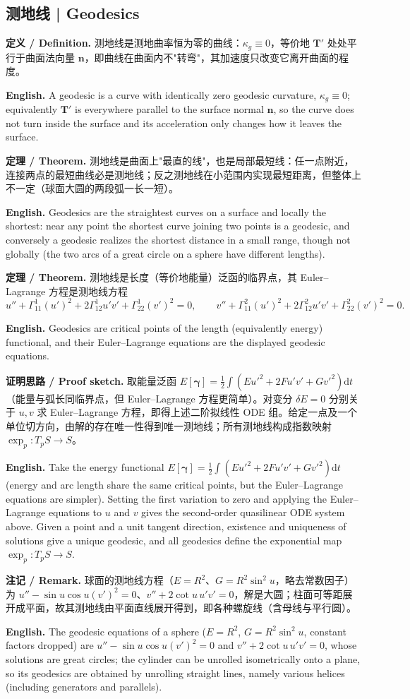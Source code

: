 \documentclass[UTF8,11pt,a4paper]{ctexart}
\newcommand{\EN}[1]{\par\noindent \textbf{English.} #1\par}
\newcommand{\DEF}[2]{\par\noindent\textbf{定义 / Definition.} #1\par\EN{#2}\par\smallskip}
\newcommand{\THM}[2]{\par\noindent\textbf{定理 / Theorem.} #1\par\EN{#2}\par\smallskip}
\newcommand{\PROOF}[2]{\par\noindent\textbf{证明思路 / Proof sketch.} #1\par\EN{#2}\par\smallskip}
\newcommand{\REM}[2]{\par\noindent\textbf{注记 / Remark.} #1\par\EN{#2}\par\smallskip}
\newcommand{\dd}{\mathrm{d}}
\newcommand{\bn}{\mathbf{n}}
\newcommand{\bT}{\mathbf{T}}
\newcommand{\bgamma}{\boldsymbol{\gamma}}
\begin{document}
\subsection{测地线 | Geodesics}
\DEF{测地线是测地曲率恒为零的曲线：$\kappa_g\equiv0$，等价地 $\bT'$ 处处平行于曲面法向量 $\bn$，即曲线在曲面内不"转弯"，其加速度只改变它离开曲面的程度。}{A geodesic is a curve with identically zero geodesic curvature, $\kappa_g\equiv0$; equivalently $\bT'$ is everywhere parallel to the surface normal $\bn$, so the curve does not turn inside the surface and its acceleration only changes how it leaves the surface.}
\THM{测地线是曲面上"最直的线"，也是局部最短线：任一点附近，连接两点的最短曲线必是测地线；反之测地线在小范围内实现最短距离，但整体上不一定（球面大圆的两段弧一长一短）。}{Geodesics are the straightest curves on a surface and locally the shortest: near any point the shortest curve joining two points is a geodesic, and conversely a geodesic realizes the shortest distance in a small range, though not globally (the two arcs of a great circle on a sphere have different lengths).}
\THM{测地线是长度（等价地能量）泛函的临界点，其 Euler--Lagrange 方程是测地线方程
\[
u''+\Gamma^1_{11}(u')^2+2\Gamma^1_{12}u'v'+\Gamma^1_{22}(v')^2=0,\qquad
v''+\Gamma^2_{11}(u')^2+2\Gamma^2_{12}u'v'+\Gamma^2_{22}(v')^2=0 .
\]
}{Geodesics are critical points of the length (equivalently energy) functional, and their Euler--Lagrange equations are the displayed geodesic equations.}
\PROOF{取能量泛函 $E[\bgamma]=\frac12\int\left(Eu'^2+2Fu'v'+Gv'^2\right)\dd t$（能量与弧长同临界点，但 Euler--Lagrange 方程更简单）。对变分 $\delta E=0$ 分别关于 $u,v$ 求 Euler--Lagrange 方程，即得上述二阶拟线性 ODE 组。给定一点及一个单位切方向，由解的存在唯一性得到唯一测地线；所有测地线构成指数映射 $\exp_p:T_pS\to S$。}{Take the energy functional $E[\bgamma]=\frac12\int(Eu'^2+2Fu'v'+Gv'^2)\dd t$ (energy and arc length share the same critical points, but the Euler--Lagrange equations are simpler). Setting the first variation to zero and applying the Euler--Lagrange equations to $u$ and $v$ gives the second-order quasilinear ODE system above. Given a point and a unit tangent direction, existence and uniqueness of solutions give a unique geodesic, and all geodesics define the exponential map $\exp_p:T_pS\to S$.}
\REM{球面的测地线方程（$E=R^2$、$G=R^2\sin^2u$，略去常数因子）为 $u''-\sin u\cos u(v')^2=0$、$v''+2\cot u\,u'v'=0$，解是大圆；柱面可等距展开成平面，故其测地线由平面直线展开得到，即各种螺旋线（含母线与平行圆）。}{The geodesic equations of a sphere ($E=R^2$, $G=R^2\sin^2u$, constant factors dropped) are $u''-\sin u\cos u(v')^2=0$ and $v''+2\cot u\,u'v'=0$, whose solutions are great circles; the cylinder can be unrolled isometrically onto a plane, so its geodesics are obtained by unrolling straight lines, namely various helices (including generators and parallels).}
\end{document}
